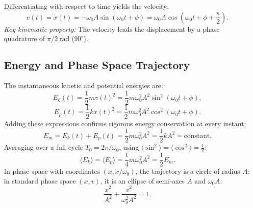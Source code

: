Differentiating with respect to time yields the velocity:
\begin{equation}
v(t) = \dot{x}(t) = -\omega_0 A \sin(\omega_0 t + \phi) = \omega_0 A \cos\left(\omega_0 t + \phi + \frac{\pi}{2}\right).
\end{equation}
\emph{Key kinematic property:} The velocity leads the displacement by a phase quadrature of $\pi/2\ \mathrm{rad}$ ($90^\circ$).

\subsection{Energy and Phase Space Trajectory}

The instantaneous kinetic and potential energies are:
\begin{equation}
E_k(t) = \frac{1}{2}m v(t)^2 = \frac{1}{2}m \omega_0^2 A^2 \sin^2(\omega_0 t + \phi),
\end{equation}
\begin{equation}
E_p(t) = \frac{1}{2}k x(t)^2 = \frac{1}{2}m \omega_0^2 A^2 \cos^2(\omega_0 t + \phi).
\end{equation}
Adding these expressions confirms rigorous energy conservation at every instant:
\begin{equation}
E_m = E_k(t) + E_p(t) = \frac{1}{2}m \omega_0^2 A^2 = \frac{1}{2}k A^2 = \text{constant}.
\end{equation}
Averaging over a full cycle $T_0 = 2\pi/\omega_0$, using $\langle \sin^2 \rangle = \langle \cos^2 \rangle = \frac{1}{2}$:
\begin{equation}
\langle E_k \rangle = \langle E_p \rangle = \frac{1}{4} m \omega_0^2 A^2 = \frac{1}{2} E_m.
\end{equation}
In phase space with coordinates $(x, \dot{x}/\omega_0)$, the trajectory is a circle of radius $A$; in standard phase space $(x, v)$, it is an ellipse of semi-axes $A$ and $\omega_0 A$:
\begin{equation}
\frac{x^2}{A^2} + \frac{v^2}{\omega_0^2 A^2} = 1.
\end{equation}


